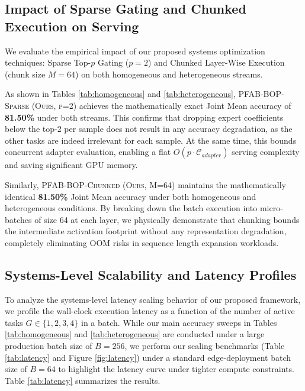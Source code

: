 \subsection{Impact of Sparse Gating and Chunked Execution on Serving}
We evaluate the empirical impact of our proposed systems optimization techniques: Sparse Top-$p$ Gating ($p=2$) and Chunked Layer-Wise Execution (chunk size $M=64$) on both homogeneous and heterogeneous streams.

As shown in Tables \ref{tab:homogeneous} and \ref{tab:heterogeneous}, \textsc{PFAB-BOP-Sparse (Ours, p=2)} achieves the mathematically exact Joint Mean accuracy of \textbf{81.50\%} under both streams. This confirms that dropping expert coefficients below the top-2 per sample does not result in any accuracy degradation, as the other tasks are indeed irrelevant for each sample. At the same time, this bounds concurrent adapter evaluation, enabling a flat $O(p \cdot \mathcal{C}_{adapter})$ serving complexity and saving significant GPU memory.

Similarly, \textsc{PFAB-BOP-Chunked (Ours, M=64)} maintains the mathematically identical \textbf{81.50\%} Joint Mean accuracy under both homogeneous and heterogeneous conditions. By breaking down the batch execution into micro-batches of size 64 at each layer, we physically demonstrate that chunking bounds the intermediate activation footprint without any representation degradation, completely eliminating OOM risks in sequence length expansion workloads.

\subsection{Systems-Level Scalability and Latency Profiles}
To analyze the systems-level latency scaling behavior of our proposed framework, we profile the wall-clock execution latency as a function of the number of active tasks $G \in \{1, 2, 3, 4\}$ in a batch. While our main accuracy sweeps in Tables \ref{tab:homogeneous} and \ref{tab:heterogeneous} are conducted under a large production batch size of $B=256$, we perform our scaling benchmarks (Table \ref{tab:latency} and Figure \ref{fig:latency}) under a standard edge-deployment batch size of $B=64$ to highlight the latency curve under tighter compute constraints. Table \ref{tab:latency} summarizes the results.

